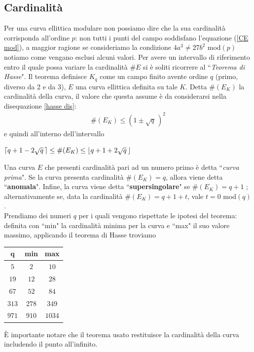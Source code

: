 \documentclass[a4paper,12pt]{tesiinfo}
\DeclarePairedDelimiter\ceil{\lceil}{\rceil}
\DeclarePairedDelimiter\floor{\lfloor}{\rfloor}
\begin{document}
\subsection{Cardinalit\`a}
\label{cardin}
Per una curva ellittica modulare non possiamo dire che la sua cardinalit\`a corrisponda all'ordine $p$: non tutti i punti del campo soddisfano l'equazione (\ref{CE mod}), a maggior ragione se consideriamo la condizione $4a^3 \ne 27b^2$ mod$(p)$ notiamo come vengano esclusi alcuni valori. Per avere un intervallo di riferimento entro il quale possa variare la cardinalit\`a $\#E$ si \`e soliti ricorrere al ``\textit{Teorema di Hasse}". Il teorema definisce $K_q$ come un campo finito avente ordine $q$ (primo, diverso da 2 e da 3), $E$ una curva ellittica definita su tale $K$. Detta $\#(E_K)$ la cardinalit\`a della curva, il valore che questa assume \`e da considerarsi nella disequazione \ref{hasse dis}:
\begin{gather}
 \#(E_K) \le (1 \pm \sqrt {q} \,)^2
 \label{hasse dis}
\end{gather}
e quindi all'interno dell'intervallo
\begin{center}
 $\ceil{q+1-2 \sqrt {q} \,} \le \#(E_K) \le \floor{q+1+2 \sqrt {q} \,}$
\end{center}
Una curva $E$ che presenti cardinalit\`a pari ad un numero primo \`e detta ``\textit{curva prima}". Se la curva presenta cardinalit\`a $\#(E_K)=q$, allora viene detta ``\textbf{anomala}". Infine, la curva viene detta ``\textbf{supersingolare}" se $\#(E_K) = q+1$ \cite{supersingolare}; alternativamente se, data la cardinalit\`a $\#(E_K) = q+1+t$, vale $t=0$ mod$(q)$ \cite{rho for poliwag}.
\\
Prendiamo dei numeri $q$ per i quali vengono rispettate le ipotesi del teorema: definita con ``min" la cardinalit\`a minima per la curva e ``max" il suo valore massimo, applicando il teorema di Hasse troviamo
\begin{center}
\begin{tabular}{ c | c c }
 q & min & max\\
 \hline
 $5$ &$2$ &$10$\\
 $19$ &$12$ &$28$\\
 $67$ &$52$ &$84$\\
 $313$ &$278$ &$349$\\
 $971$ &$910$ &$1034$\\
\end{tabular}
\end{center}
\`E importante notare che il teorema usato restituisce la cardinalit\`a della curva includendo il punto all'infinito.
\end{document}
